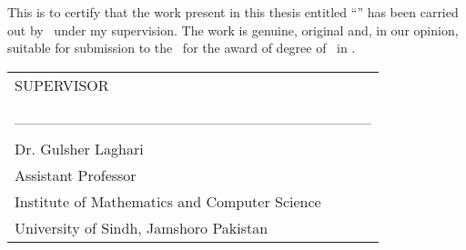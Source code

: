 
This is to certify that the work present in this thesis entitled ``\emph{\thesisTitle}'' has been carried out by \emph{\thesisAuthor}~under my supervision. The work is genuine, original and, in our opinion, suitable for submission to the \university~for the award of degree of \emph{\degree}~in \emph{\degreeSubject}.

\vspace{3cm} %


\flushleft
\begin{tabular}{l}
SUPERVISOR \\\\\\
--------------------------------------------------------------------------\\
Dr. Gulsher Laghari\\
Assistant Professor\\
Institute of Mathematics and Computer Science\\
University of Sindh, Jamshoro Pakistan\\
\end{tabular}



\cleardoublepage